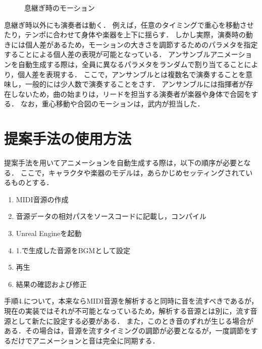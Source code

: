 \begin{figure}[!h]
	\caption{息継ぎ時のモーション}
	\label{fig:breath_motion}
\vspace{10mm}
\end{figure}
\newpage
\indent
息継ぎ時以外にも演奏者は動く．
例えば，任意のタイミングで重心を移動させたり，テンポに合わせて身体や楽器を上下に揺らす．
しかし実際，演奏時の動きには個人差があるため，モーションの大きさを調節するためのパラメタを指定することによる個人差の表現が可能となっている．
アンサンブルアニメーションを自動生成する際は，全員に異なるパラメタをランダムで割り当てることにより，個人差を表現する．
ここで，アンサンブルとは複数名で演奏することを意味し，一般的には少人数で演奏することをさす．
アンサンブルには指揮者が存在しないため，曲の始まりは，リードを担当する演奏者が楽器や身体で合図をする．
なお，重心移動や合図のモーションは，武内が担当した．

\section{提案手法の使用方法} \label{sec:howto}
提案手法を用いてアニメーションを自動生成する際は，以下の順序が必要となる．
ここで，キャラクタや楽器のモデルは，あらかじめセッティングされているものとする．
\begin{enumerate}
	\item MIDI音源の作成
	\item 音源データの相対パスをソースコードに記載し，コンパイル
	\item Unreal Engineを起動
	\item 1.で生成した音源をBGMとして設定
	\item 再生
	\item 結果の確認および修正
\end{enumerate}\par
手順4.について，本来ならMIDI音源を解析すると同時に音を流すべきであるが，現在の実装ではそれが不可能となっているため，解析する音源とは別に，流す音源として新たに設定する必要がある．
また，このとき音のずれが生じる場合がある．その場合は，音源を流すタイミングの調節が必要となるが，一度調節をするだけでアニメーションと音は完全に同期する．